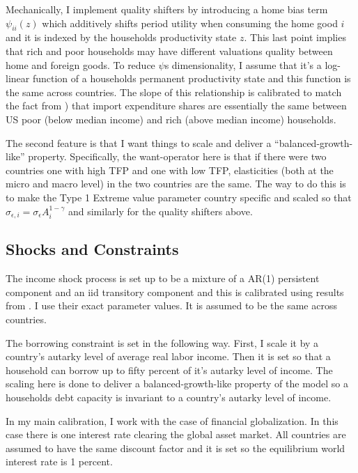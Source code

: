 \documentclass[12pt,pdftex]{article}
\begin{document}
\begin{onehalfspacing}
Mechanically, I implement quality shifters by introducing a home bias term $\psi_{ii}(z)$ which additively shifts period utility when consuming the home good $i$ and it is indexed by the households productivity state $z$. This last point implies that rich and poor households may have different valuations quality between home and foreign goods. To reduce $\psi$s dimensionality, I assume that it's a log-linear function of a households permanent productivity state and this function is the same across countries. The slope of this relationship is calibrated to match the fact from \citet{borusyak2021distributional}) that import expenditure shares are essentially the same between US poor (below median income) and rich (above median income) households.

The second feature is that I want things to scale and deliver a ``balanced-growth-like'' property. Specifically, the want-operator here is that if there were two countries one with high TFP and one with low TFP, elasticities (both at the micro and macro level) in the two countries are the same. The way to do this is to make the Type 1 Extreme value parameter country specific and scaled so that $\sigma_{\epsilon,i} = \sigma_{\epsilon} A_i^{1-\gamma}$ and similarly for the quality shifters above.

\subsection{Shocks and Constraints}

The income shock process is set up to be a mixture of a AR(1) persistent component and an iid transitory component and this is calibrated using results from \citet*{krueger2016macroeconomics}. I use their exact parameter values. It is assumed to be the same across countries.

The borrowing constraint is set in the following way. First, I scale it by a country's autarky level of average real labor income. Then it is set so that a household can borrow up to fifty percent of it's autarky level of income. The scaling here is done to deliver a balanced-growth-like property of the model so a households debt capacity is invariant to a country's autarky level of income.

In my main calibration, I work with the case of financial globalization. In this case there is one interest rate clearing the global asset market. All countries are assumed to have the same discount factor and it is set so the equilibrium world interest rate is 1 percent.


\end{onehalfspacing}
\end{document}
